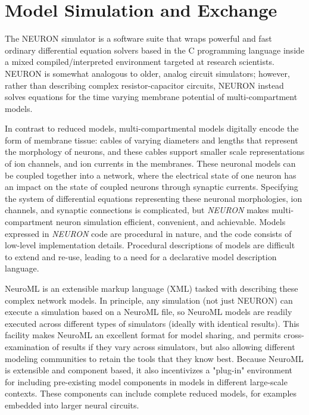 \section{Model Simulation and Exchange}
The NEURON \cite{carnevale2006neuron} simulator is a software suite that wraps powerful and fast ordinary differential equation solvers based in the C programming language inside a mixed compiled/interpreted environment targeted at research scientists. NEURON is somewhat analogous to older, analog circuit simulators;
however, rather than describing complex resistor-capacitor circuits, NEURON instead solves equations for the time varying membrane potential of multi-compartment models.

In contrast to reduced models, multi-compartmental models digitally encode the form of membrane tissue: cables of varying diameters and lengths that represent the morphology of neurons, and these cables support smaller scale representations of ion channels, and ion currents in the membranes.
These neuronal models can be coupled together into a network, where the electrical state of one neuron has an impact on the state of coupled neurons through synaptic currents.
Specifying the system of differential equations representing these neuronal morphologies, ion channels, and synaptic connections is complicated, but \emph{NEURON} makes multi-compartment neuron simulation efficient, convenient, and achievable.
Models expressed in \emph{NEURON} code are procedural in nature, and the code consists of low-level implementation details.
Procedural descriptions of models are difficult to extend and re-use, leading to a need for a declarative model description language.

NeuroML \cite{gleeson2010neuroml} is an extensible markup language (XML) tasked with describing these complex network models.
In principle, any simulation (not just NEURON) can execute a simulation based on a NeuroML file, so NeuroML models are readily executed across different types of simulators (ideally with identical results).
This facility makes NeuroML an excellent format for model sharing, and permits cross-examination of results if they vary across simulators, but also allowing different modeling communities to retain the tools that they know best.
Because NeuroML is extensible and component based, it also incentivizes a "plug-in" environment for including pre-existing model components in models in different large-scale contexts.
These components can include complete reduced models, for examples embedded into larger neural circuits.

